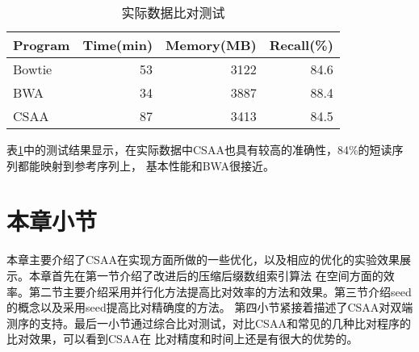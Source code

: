 \begin{table}[htbp]
    \caption{实际数据比对测试}
    \label{tab:tab3}
    \centering
    \begin{tabular}{lrrr}
       \toprule
       Program&Time(min)&Memory(MB)&Recall(\%)\\
       \midrule
       Bowtie&53&3122&84.6\\
       BWA&34&3887&88.4\\
       CSAA&87&3413&84.5\\
       \bottomrule
    \end{tabular}
\end{table}

表\ref{tab:tab3}中的测试结果显示，在实际数据中CSAA也具有较高的准确性，84\%的短读序列都能映射到参考序列上，
基本性能和BWA很接近。

\section{本章小节}

本章主要介绍了CSAA在实现方面所做的一些优化，以及相应的优化的实验效果展示。本章首先在第一节介绍了改进后的压缩后缀数组索引算法
在空间方面的效率。第二节主要介绍采用并行化方法提高比对效率的方法和效果。第三节介绍seed的概念以及采用seed提高比对精确度的方法。
第四小节紧接着描述了CSAA对双端测序的支持。最后一小节通过综合比对测试，对比CSAA和常见的几种比对程序的比对效果，可以看到CSAA在
比对精度和时间上还是有很大的优势的。
